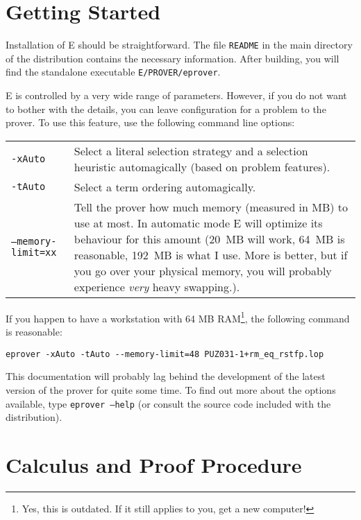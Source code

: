 \documentclass{article}
\begin{document}
\section{Getting Started}
\label{sec:start}

Installation of E should be straightforward. The file \texttt{README}
in the main directory of the distribution contains the necessary
information. After building, you will find the standalone executable
\texttt{E/PROVER/eprover}.

E is controlled by a very wide range of parameters. However, if you do
not want to bother with the details, you can leave configuration for a
problem to the prover. To use this feature, use the following command
line options:

\bigskip
\noindent
\begin{tabular}{lp{7.5cm}}
  \texttt{-xAuto} & Select a literal selection strategy and a
  selection heuristic automagically (based on problem features).\\
  \texttt{-tAuto} & Select a term ordering automagically.\\
  \texttt{--memory-limit=xx} & Tell the prover how much memory
  (measured in MB) to use at most. In automatic mode E will optimize
  its behaviour for this amount (20~MB will work, 64~MB is
  reasonable, 192~MB is what I use. More is better, but if you go over
  your physical memory, you will probably experience \emph{very} heavy
  swapping.).\\
\end{tabular}

\begin{example}
  If you happen to have a workstation with 64 MB RAM\footnote{Yes,
    this is outdated. If it still applies to you, get a new
    computer!}, the following command is reasonable: 
\small
\begin{verbatim}
eprover -xAuto -tAuto --memory-limit=48 PUZ031-1+rm_eq_rstfp.lop
\end{verbatim}
  \normalsize
\end{example}

This documentation will probably lag behind the development of the
latest version of the prover for quite some time. To find out more
about the options available, type \texttt{eprover --help} (or consult
the source code included with the distribution).



\section{Calculus and Proof Procedure}
\label{sec:calculus}
\end{document}
